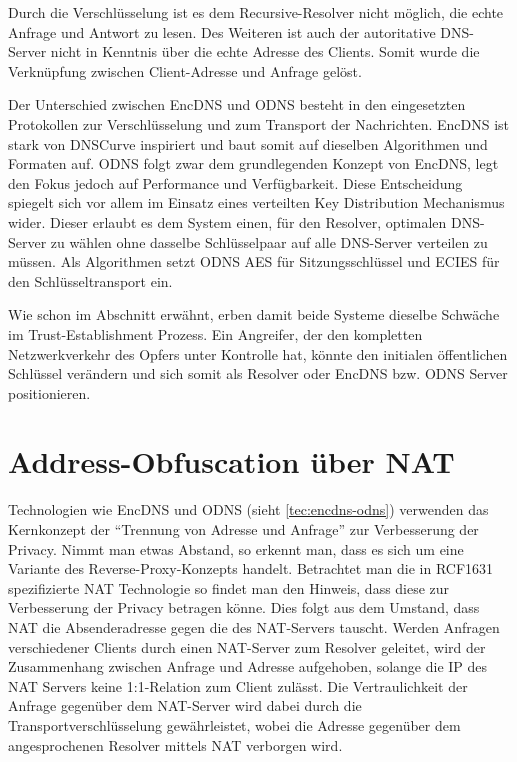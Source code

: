 Durch die Verschlüsselung ist es dem Recursive-Resolver nicht möglich, die echte Anfrage und Antwort zu lesen. Des Weiteren ist auch der autoritative DNS-Server nicht in Kenntnis über die echte Adresse des Clients. Somit wurde die Verknüpfung zwischen Client-Adresse und Anfrage gelöst.

Der Unterschied zwischen EncDNS und ODNS besteht in den eingesetzten Protokollen zur Verschlüsselung und zum Transport der Nachrichten. EncDNS ist stark von DNSCurve inspiriert und baut somit auf dieselben Algorithmen und Formaten auf. ODNS folgt zwar dem grundlegenden Konzept von EncDNS, legt den Fokus jedoch auf Performance und Verfügbarkeit. Diese Entscheidung spiegelt sich vor allem im Einsatz eines verteilten Key Distribution Mechanismus wider. Dieser erlaubt es dem System einen, für den Resolver, optimalen DNS-Server zu wählen ohne dasselbe Schlüsselpaar auf alle DNS-Server verteilen zu müssen. Als Algorithmen setzt ODNS AES für Sitzungsschlüssel und ECIES für den Schlüsseltransport ein.

Wie schon im Abschnitt  erwähnt, erben damit beide Systeme dieselbe Schwäche im Trust-Establishment Prozess. Ein Angreifer, der den kompletten Netzwerkverkehr des Opfers unter Kontrolle hat, könnte den initialen öffentlichen Schlüssel verändern und sich somit als Resolver oder EncDNS bzw. ODNS Server positionieren.

\section{Address-Obfuscation über NAT}
\label{sec:tec-nat}
Technologien wie EncDNS und \ac{ODNS} (sieht \ref{tec:encdns-odns}) verwenden das Kernkonzept der ``Trennung von Adresse und Anfrage'' zur Verbesserung der Privacy. Nimmt man etwas Abstand, so erkennt man, dass es sich um eine Variante des Reverse-Proxy-Konzepts handelt. Betrachtet man die in RCF1631\cite{rfc1631} spezifizierte \ac{NAT} Technologie so findet man den Hinweis, dass diese zur Verbesserung der Privacy betragen könne. Dies folgt aus dem Umstand, dass NAT die Absenderadresse gegen die des NAT-Servers tauscht. Werden Anfragen verschiedener Clients durch einen NAT-Server zum Resolver geleitet, wird der Zusammenhang zwischen Anfrage und Adresse aufgehoben, solange die IP des NAT Servers keine 1:1-Relation zum Client zulässt. Die Vertraulichkeit der Anfrage gegenüber dem NAT-Server wird dabei durch die Transportverschlüsselung gewährleistet, wobei die Adresse gegenüber dem angesprochenen Resolver mittels NAT verborgen wird.

